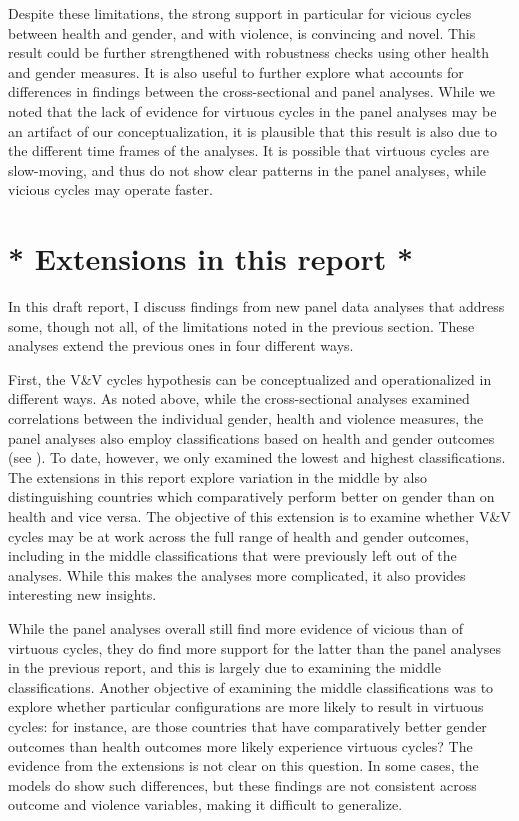 \documentclass[12pt]{article}
\begin{document}
Despite these limitations, the strong support in particular for vicious cycles between health and gender, and with violence, is convincing and novel.
This result could be further strengthened with robustness checks using other health and gender measures.
It is also useful to further explore what accounts for differences in findings between the cross-sectional and panel analyses.
While we noted that the lack of evidence for virtuous cycles in the panel analyses may be an artifact of our conceptualization, it is plausible that this result is also due to the different time frames of the analyses. It is possible that virtuous cycles are slow-moving, and thus do not show clear patterns in the panel analyses, while vicious cycles may operate faster.

\section{* Extensions in this report *}
\label{extensions}

In this draft report, I discuss findings from new panel data analyses that address some, though not all, of the limitations noted in the previous section. These analyses extend the previous ones in four different ways.

First, the V\&V cycles hypothesis can be conceptualized and operationalized in different ways. As noted above, while the cross-sectional analyses examined correlations between the individual gender, health and violence measures, the panel analyses also employ classifications based on health and gender outcomes (see ). To date, however, we only examined the lowest and highest classifications. The extensions in this report explore variation in the middle by also distinguishing countries which comparatively perform better on gender than on health and vice versa. The objective of this extension is to examine whether V\&V cycles may be at work across the full range of health and gender outcomes, including in the middle classifications that were previously left out of the analyses. While this makes the analyses more complicated, it also provides interesting new insights.

While the panel analyses overall still find more evidence of vicious than of virtuous cycles, they do find more support for the latter than the panel analyses in the previous report, and this is largely due to examining the middle classifications. Another objective of examining the middle classifications was to explore whether particular configurations are more likely to result in virtuous cycles: for instance, are those countries that have comparatively better gender outcomes than health outcomes more likely experience virtuous cycles? The evidence from the extensions is not clear on this question. In some cases, the models do show such differences, but these findings are not consistent across outcome and violence variables, making it difficult to generalize.
\end{document}
